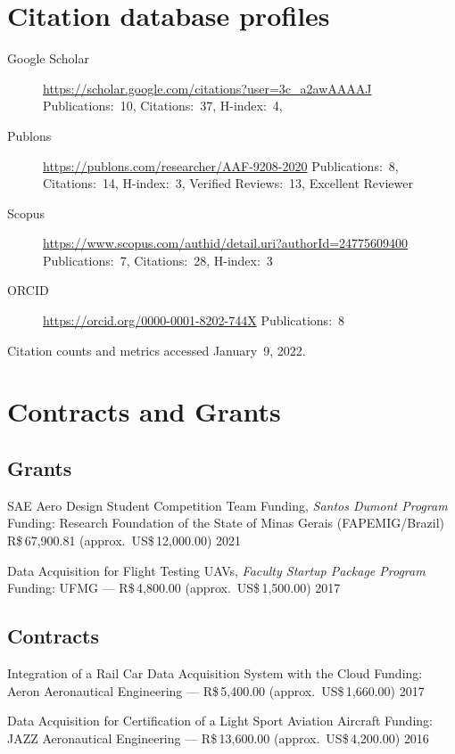 \documentclass[a4paper, 11pt, oneside]{memoir}
\begin{document}
\section{Citation database profiles}
\begin{description}
\item[Google Scholar] 
  \url{https://scholar.google.com/citations?user=3c_a2awAAAAJ}\newline
  Publications:~10, Citations:~37, H-index:~4,
\item[Publons]
  \url{https://publons.com/researcher/AAF-9208-2020}\newline
  Publications:~8, Citations:~14, H-index:~3, Verified Reviews:~13, 
  Excellent Reviewer
\item[Scopus]
  \url{https://www.scopus.com/authid/detail.uri?authorId=24775609400}\newline
  Publications:~7, Citations:~28, H-index:~3
\item[ORCID]
  \url{https://orcid.org/0000-0001-8202-744X}\newline
  Publications:~8
\end{description}

\noindent
Citation counts and metrics accessed January~9, 2022.

\section{Contracts and Grants}
\subsection{Grants}
\begin{description} 
\item {SAE Aero Design Student Competition Team Funding,}
\emph{Santos Dumont Program}
{ \newline Funding: 
  Research Foundation of the State of Minas Gerais (FAPEMIG/Brazil)
  \newline
  R\$\,67,900.81 (approx.\ US\$\,12,000.00)
}{}{}
 \hfill {2021}

\item {Data Acquisition for Flight Testing UAVs,}
\emph{Faculty Startup Package Program}
{\newline Funding: UFMG --- R\$\,4,800.00 (approx.\ US\$\,1,500.00)}{}{}
\hfill {2017}
\end{description}

\subsection{Contracts}
\begin{description} 
\item {Integration of a Rail Car Data Acquisition System with the Cloud}
{}{\newline Funding: Aeron Aeronautical Engineering ---
  R\$\,5,400.00 (approx.\ US\$\,1,660.00)}{}{}
 \hfill {2017}

\item 
{Data Acquisition for Certification of a Light Sport Aviation Aircraft}{}
{\newline Funding: JAZZ Aeronautical Engineering --- 
 R\$\,13,600.00 (approx.\ US\$\,4,200.00)}{}{}
\hfill {2016}
\end{description}
\end{document}
